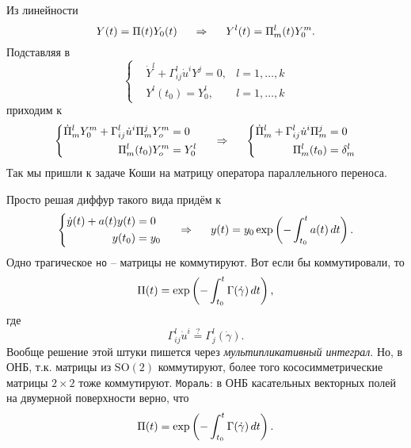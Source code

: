 Из линейности
\begin{equation*}
    Y(t) = \Pi(t) Y_0 (t)
    \hspace{0.5cm} \Rightarrow \hspace{0.5cm} 
    Y^l(t) = \Pi^l_m (t) Y_0^m.
\end{equation*}
Подставляя в 
\begin{equation*}
    \left\{\begin{aligned}
        &\dot{Y}^l + \Gamma_{ij}^{l} \dot{u}^i Y^j = 0, &l=1,\ldots,k\\
        &Y^l(t_0) = Y_0^l, &l=1,\ldots,k
    \end{aligned}\right.
\end{equation*}
приходим к
\begin{equation*}
\left\{\begin{aligned}
    \dot{\Pi}^l_m Y_0^m + \Gamma_{ij}^{l} \dot{u}^i \Pi_m^j Y_o^m &= 0 \\
    \Pi_m^l(t_0) Y_o^m &= Y_0^l
\end{aligned} \right.
\hspace{0.5cm} \Rightarrow \hspace{0.5cm} 
\left\{\begin{aligned}
    \dot{\Pi}^l_m  + \Gamma_{ij}^{l} \dot{u}^i \Pi_m^j  &= 0 \\
    \Pi_m^l(t_0) &= \delta^l_m
\end{aligned} \right.
\end{equation*}
Так мы пришли к задаче Коши на матрицу оператора параллельного переноса. 


Просто решая диффур такого вида придём к
\begin{equation}
    \left\{\begin{aligned}
        \dot{y} (t) + a(t) y(t) &= 0 \\
        y(t_0) &= y_0
    \end{aligned}\right.
    \hspace{0.5cm} \Rightarrow \hspace{0.5cm} 
    y(t) = y_0 \exp\left(-\int_{t_0}^{t} a(t) \, d t \right).
\end{equation}
Одно трагическое \texttt{но} -- матрицы не коммутируют. Вот если бы коммутировали, то
\begin{equation*}
    \Pi (t) = \exp
    \left(
        - \int_{t_0}^{t} \Gamma(\dot{\gamma}) \, d t
    \right),
\end{equation*}
где 
\begin{equation}
    \Gamma_{ij}^{l} \dot{u}^i 
    \overset{\mathrm{?}}{=} 
     \Gamma_{j}^{l} (\dot{\gamma}).
\end{equation}
Вообще решение этой штуки пишется через \textit{мультипликативный интеграл}. Но, в ОНБ, т.к. матрицы из $\mathrm{SO}(2)$ коммутируют, более того кососимметрические матрицы $2\times2$ тоже коммутируют.
\texttt{Мораль}: в ОНБ касательных векторных полей на двумерной поверхности верно, что
\begin{equation}
    \Pi (t) = \exp
    \left(
        - \int_{t_0}^{t} \Gamma(\dot{\gamma}) \, d t
    \right).
\end{equation}

